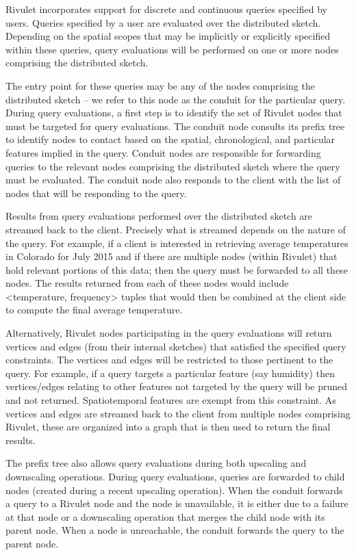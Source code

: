 Rivulet incorporates support for discrete and continuous queries specified by users. Queries specified by a user are evaluated over the distributed sketch. Depending on the spatial scopes that may be implicitly or explicitly specified within these queries, query evaluations will be performed on one or more nodes comprising the distributed sketch. 

The entry point for these queries may be any of the nodes comprising the distributed sketch – we refer to this node as the conduit for the particular query.  During query evaluations, a first step is to identify the set of Rivulet nodes that must be targeted for query evaluations. The conduit node consults its prefix tree to identify nodes to contact based on the spatial, chronological, and particular features implied in the query. Conduit nodes are responsible for forwarding queries to the relevant nodes comprising the distributed sketch where the query must be evaluated.  The conduit node also responds to the client with the list of nodes that will be responding to the query. 

Results from query evaluations performed over the distributed sketch are streamed back to the client.  Precisely what is streamed depends on the nature of the query.  For example, if a client is interested in retrieving average temperatures in Colorado for July 2015 and if there are multiple nodes (within Rivulet) that hold relevant portions of this data; then the query must be forwarded to all these nodes. The results returned from each of these nodes would include {\textless}temperature, frequency{\textgreater} tuples that would then be combined at the client side to compute the final average temperature.

Alternatively, Rivulet nodes participating in the query evaluations will return vertices and edges (from their internal sketches) that satisfied the specified query constraints. The vertices and edges will be restricted to those pertinent to the query. For example, if a query targets a particular feature (say humidity) then vertices/edges relating to other features not targeted by the query will be pruned and not returned.  Spatiotemporal features are exempt from this constraint. As vertices and edges are streamed back to the client from multiple nodes comprising Rivulet, these are organized into a graph that is then used to return the final results. 

The prefix tree also allows query evaluations during both upscaling and downscaling operations. During query evaluations, queries are forwarded to child nodes (created during a recent upscaling operation). When the conduit forwards a query to a Rivulet node and the node is unavailable, it is either due to a failure at that node or a downscaling operation that merges the child node with its parent node. When a node is unreachable, the conduit forwards the query to the parent node. 


